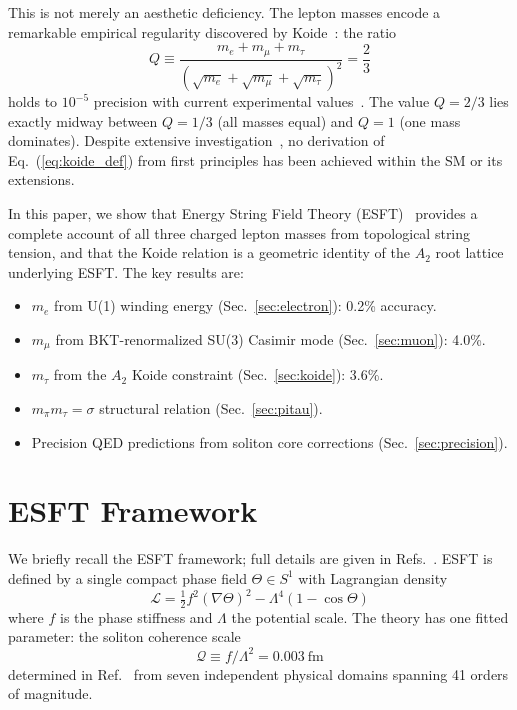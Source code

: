 ﻿\documentclass[twocolumn,preprintnumbers,amsmath,amssymb]{revtex4-2}
\newcommand{\Qoppa}{\mathcal{Q}}
\begin{document}
This is not merely an aesthetic deficiency. The lepton masses encode a remarkable empirical regularity discovered by Koide~\cite{Koide1983}: the ratio
\begin{equation}
Q \equiv \frac{m_e + m_\mu + m_\tau}{(\sqrt{m_e} + \sqrt{m_\mu} + \sqrt{m_\tau})^2} = \frac{2}{3}
\label{eq:koide_def}
\end{equation}
holds to $10^{-5}$ precision with current experimental values~\cite{PDG2024}. The value $Q = 2/3$ lies exactly midway between $Q = 1/3$ (all masses equal) and $Q = 1$ (one mass dominates). Despite extensive investigation~\cite{Foot1994,Ma2006,Sumino2009}, no derivation of Eq.~(\ref{eq:koide_def}) from first principles has been achieved within the SM or its extensions.

In this paper, we show that Energy String Field Theory (ESFT)~\cite{Paper1,Paper2} provides a complete account of all three charged lepton masses from topological string tension, and that the Koide relation is a geometric identity of the $A_2$ root lattice underlying ESFT. The key results are:

\begin{itemize}
\item $m_e$ from U(1) winding energy (Sec.~\ref{sec:electron}): 0.2\% accuracy.
\item $m_\mu$ from BKT-renormalized SU(3) Casimir mode (Sec.~\ref{sec:muon}): 4.0\%.
\item $m_\tau$ from the $A_2$ Koide constraint (Sec.~\ref{sec:koide}): 3.6\%.
\item $m_\pi m_\tau = \sigma$ structural relation (Sec.~\ref{sec:pitau}).
\item Precision QED predictions from soliton core corrections (Sec.~\ref{sec:precision}).
\end{itemize}

\section{ESFT Framework}
\label{sec:framework}

We briefly recall the ESFT framework; full details are given in Refs.~\cite{Paper1,Paper2}. ESFT is defined by a single compact phase field $\Theta \in S^1$ with Lagrangian density
\begin{equation}
\mathcal{L} = \tfrac{1}{2}f^2(\nabla\Theta)^2 - \Lambda^4(1 - \cos\Theta)
\label{eq:lagrangian}
\end{equation}
where $f$ is the phase stiffness and $\Lambda$ the potential scale. The theory has one fitted parameter: the soliton coherence scale
\begin{equation}
\Qoppa \equiv f/\Lambda^2 = 0.003~\text{fm}
\end{equation}
determined in Ref.~\cite{Paper1} from seven independent physical domains spanning 41 orders of magnitude.
\end{document}
